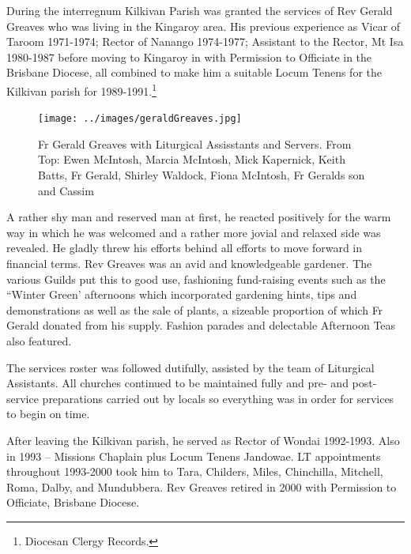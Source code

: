 During the interregnum Kilkivan Parish was granted the services of Rev Gerald Greaves who was living in the Kingaroy area. His previous experience as Vicar of Taroom 1971-1974; Rector of Nanango 1974-1977; Assistant to the Rector, Mt Isa 1980-1987 before moving to Kingaroy in with Permission to Officiate in the Brisbane Diocese, all combined to make him a suitable Locum Tenens for the Kilkivan parish for 1989-1991.\footnote{Diocesan Clergy Records.}








\begin{figure}
\begin{center}
\texttt{[image: ../images/geraldGreaves.jpg]}
\caption{Fr Gerald Greaves with Liturgical Assisstants and Servers. From Top: Ewen McIntosh, Marcia McIntosh, Mick Kapernick, Keith Batts, Fr Gerald, Shirley Waldock, Fiona McIntosh, Fr Geralds son and Cassim}
\end{center}
\end{figure}


A rather shy man and reserved man at first, he reacted positively for the warm way in which he was welcomed and a rather more jovial and relaxed side was revealed. He gladly threw his efforts behind all efforts to move forward in financial terms. Rev Greaves was an avid and knowledgeable gardener. The various Guilds put this to good use, fashioning fund-raising events such as the ``Winter Green' afternoons which incorporated gardening hints, tips and demonstrations as well as the sale of plants, a sizeable proportion of which Fr Gerald donated from his supply. Fashion parades and delectable Afternoon Teas also featured.



The services roster was followed dutifully, assisted by the team of Liturgical Assistants. All churches continued to be maintained fully and pre- and post-service preparations carried out by locals so everything was in order for services to begin on time.



After leaving the Kilkivan parish, he served as Rector of Wondai 1992-1993. Also in 1993 -- Missions Chaplain plus Locum Tenens Jandowae. LT appointments throughout 1993-2000 took him to Tara, Childers, Miles, Chinchilla, Mitchell, Roma, Dalby, and Mundubbera. Rev Greaves retired in 2000 with Permission to Officiate, Brisbane Diocese.



